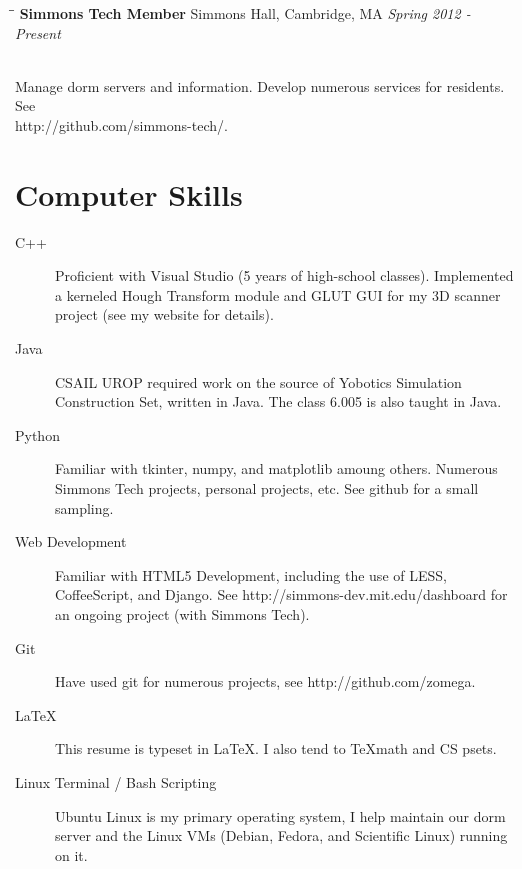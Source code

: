 \documentclass{res}
\begin{document}
\begin{resume}
			\begin{tabbing}
				\hspace{2.3in}\= \hspace{2.6in}\= \kill %
				{\bf Simmons Tech Member}	\>Simmons Hall, Cambridge, MA	\> \textit{Spring 2012 - Present}

				\\Manage dorm servers and information. Develop numerous services for residents. See\\http://github.com/simmons-tech/.

			\end{tabbing}

		\vspace{-20pt}
		\section{Computer Skills}

			\begin{description}

				\item[C++] Proficient with Visual Studio (5 years of high-school classes). Implemented a kerneled Hough Transform module and GLUT GUI for my 3D scanner project (see my website for details).

				\item[Java] CSAIL UROP required work on the source of Yobotics Simulation Construction Set, written in Java. The class 6.005 is also taught in Java.

				\item[Python] Familiar with tkinter, numpy, and matplotlib amoung others. Numerous Simmons Tech projects, personal projects, etc. See github for a small sampling.

				\item[Web Development] Familiar with HTML5 Development, including the use of LESS, CoffeeScript, and Django. See http://simmons-dev.mit.edu/dashboard for an ongoing project (with Simmons Tech).

				\item[Git] Have used git for numerous projects, see http://github.com/zomega.

				\item[\LaTeX] This resume is typeset in \LaTeX. I also tend to \TeX \space math and CS psets.

				\item[Linux Terminal / Bash Scripting] Ubuntu Linux is my primary operating system, I help maintain our dorm server and the Linux VMs (Debian, Fedora, and Scientific Linux) running on it.

			\end{description}
	\end{resume}
\end{document}
